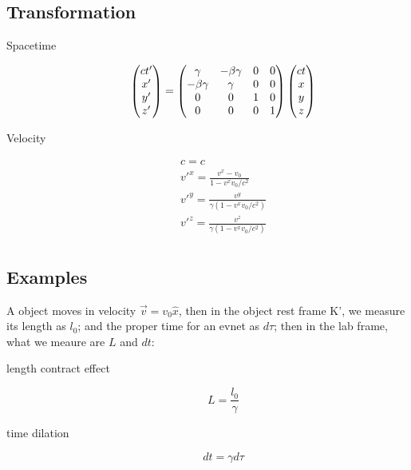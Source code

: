 \subsection{Transformation}
\begin{description}
    \item [Spacetime]
	\begin{equation}
	    \label{eqn:sr::spacetime}
	    \begin{pmatrix}
		ct' \\
		x'  \\
		y'  \\
		z'  \\
	    \end{pmatrix}
	    =
	    \begin{pmatrix}
		\gamma	& -\beta\gamma	&   0	& 0 \\
		-\beta\gamma	& \gamma    & 0	& 0 \\
		0   & 0	& 1 & 0	\\
		0   & 0	& 0 & 1	\\
	    \end{pmatrix}
	    \begin{pmatrix}
		ct \\
		x  \\
		y  \\
		z  \\
	    \end{pmatrix}
	\end{equation}

    \item [Velocity]
	\begin{equation}
	    \label{eqn:sr::velocity}
	    \begin{gathered}
		c = c	\\
		v'^x = \frac{v^x - v_0}{1-v^xv_0/c^2}	\\
		v'^y = \frac{v^y}{\gamma(1-v^xv_0/c^2)}	\\
		v'^z = \frac{v^z}{\gamma(1-v^xv_0/c^2)}	\\
	    \end{gathered}
	\end{equation}
\end{description}

\subsection{Examples}
A object moves in velocity $\vec{v} = v_0\hat{x}$, then in the 
object rest frame K', we measure its length as $l_0$; and the
proper time for an evnet as $d\tau$; then in the lab frame, what 
we meaure are $L$ and $dt$:
\begin{description}
    \item [length contract effect]
	\begin{equation}
	L = \frac{l_0}{\gamma}
	\end{equation}

    \item [time dilation]
	\begin{equation}
	    dt = \gamma d\tau
	\end{equation}
\end{description}

